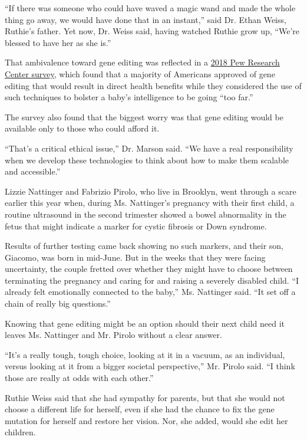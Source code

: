 ``If there was someone who could have waved a magic wand and made the
whole thing go away, we would have done that in an instant,'' said Dr.
Ethan Weiss, Ruthie's father. Yet now, Dr. Weiss said, having watched
Ruthie grow up, ``We're blessed to have her as she is.''

That ambivalence toward gene editing was reflected in a
\href{https://www.pewresearch.org/science/2018/07/26/public-views-of-gene-editing-for-babies-depend-on-how-it-would-be-used/}{2018
Pew Research Center survey}, which found that a majority of Americans
approved of gene editing that would result in direct health benefits
while they considered the use of such techniques to bolster a baby's
intelligence to be going ``too far.''

The survey also found that the biggest worry was that gene editing would
be available only to those who could afford it.

``That's a critical ethical issue,'' Dr. Marson said. ``We have a real
responsibility when we develop these technologies to think about how to
make them scalable and accessible.''

Lizzie Nattinger and Fabrizio Pirolo, who live in Brooklyn, went through
a scare earlier this year when, during Ms. Nattinger's pregnancy with
their first child, a routine ultrasound in the second trimester showed a
bowel abnormality in the fetus that might indicate a marker for cystic
fibrosis or Down syndrome.

Results of further testing came back showing no such markers, and their
son, Giacomo, was born in mid-June. But in the weeks that they were
facing uncertainty, the couple fretted over whether they might have to
choose between terminating the pregnancy and caring for and raising a
severely disabled child. ``I already felt emotionally connected to the
baby,'' Ms. Nattinger said. ``It set off a chain of really big
questions.''

Knowing that gene editing might be an option should their next child
need it leaves Ms. Nattinger and Mr. Pirolo without a clear answer.

``It's a really tough, tough choice, looking at it in a vacuum, as an
individual, versus looking at it from a bigger societal perspective,''
Mr. Pirolo said. ``I think those are really at odds with each other.''

Ruthie Weiss said that she had sympathy for parents, but that she would
not choose a different life for herself, even if she had the chance to
fix the gene mutation for herself and restore her vision. Nor, she
added, would she edit her children.

